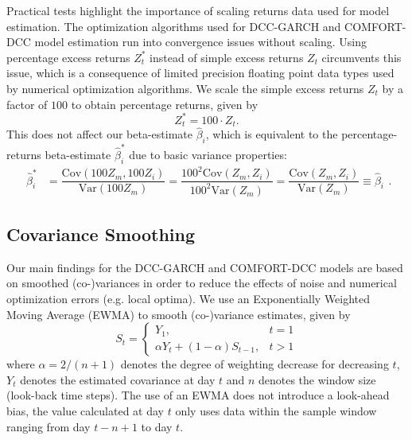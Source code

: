 \documentclass[11pt,a4paper]{article}
\begin{document}
Practical tests highlight the importance of scaling returns data used for model estimation. The optimization algorithms used for DCC-GARCH and COMFORT-DCC model estimation run into convergence issues without scaling. Using percentage excess returns $Z^*_{t}$ instead of simple excess returns $Z_t$ circumvents this issue, which is a consequence of limited precision floating point data types used by numerical optimization algorithms. We scale the simple excess returns $Z_t$ by a factor of $100$ to obtain percentage returns, given by
\begin{equation}
    Z^*_{t} = 100 \cdot Z_t.
\end{equation}
This does not affect our beta-estimate $\hat{\beta}_{i}$, which is equivalent to the percentage-returns beta-estimate $\hat{\beta}_{i}^*$ due to basic variance properties:
\begin{equation}
\begin{split}
\hat{\beta}_{i}^* & = \dfrac{ \textrm{Cov}(100 Z_m, 100 Z_i) }{ \textrm{Var}(100 Z_m) } = \dfrac{ {100^2} \textrm{Cov}(Z_m, Z_i) }{ {100^2} \textrm{Var}(Z_m) } = \dfrac{ \textrm{Cov}(Z_m, Z_i) }{ \textrm{Var}(Z_m) } \equiv \hat\beta_i
\end{split}.
\end{equation}



\subsection{Covariance Smoothing}

Our main findings for the DCC-GARCH and COMFORT-DCC models are based on smoothed (co-)variances in order to reduce the effects of noise and numerical optimization errors (e.g. local optima). We use an Exponentially Weighted Moving Average (EWMA) to smooth (co-)variance estimates, given by
\begin{equation}
S_t = \begin{cases}
 Y_1,                                           & t = 1 \\
 \alpha Y_t + (1 - \alpha) S_{t-1}, & t > 1
\end{cases}
\end{equation}
where $\alpha = 2/(n+1)$ denotes the degree of weighting decrease for decreasing $t$, $Y_t$ denotes the estimated covariance at day $t$ and $n$ denotes the window size (look-back time steps). The use of an EWMA does not introduce a look-ahead bias, the value calculated at day $t$ only uses data within the sample window ranging from day $t - n + 1$ to day $t$.
\end{document}
